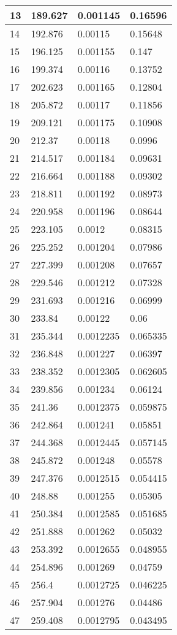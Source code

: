 \documentclass[twocolumn]{article}
\begin{document}
\begin{tabular}{l|l|l|l}
13	&	189.627	&	0.001145	&	0.16596  \\ \hline
14	&	192.876	&	0.00115	&	0.15648  \\ \hline
15	&	196.125	&	0.001155	&	0.147  \\ \hline
16	&	199.374	&	0.00116	&	0.13752  \\ \hline
17	&	202.623	&	0.001165	&	0.12804  \\ \hline
18	&	205.872	&	0.00117	&	0.11856  \\ \hline
19	&	209.121	&	0.001175	&	0.10908  \\ \hline
20	&	212.37	&	0.00118	&	0.0996  \\ \hline
21	&	214.517	&	0.001184	&	0.09631  \\ \hline
22	&	216.664	&	0.001188	&	0.09302  \\ \hline
23	&	218.811	&	0.001192	&	0.08973  \\ \hline
24	&	220.958	&	0.001196	&	0.08644  \\ \hline
25	&	223.105	&	0.0012	&	0.08315  \\ \hline
26	&	225.252	&	0.001204	&	0.07986  \\ \hline
27	&	227.399	&	0.001208	&	0.07657  \\ \hline
28	&	229.546	&	0.001212	&	0.07328  \\ \hline
29	&	231.693	&	0.001216	&	0.06999  \\ \hline
30	&	233.84	&	0.00122	&	0.06  \\ \hline
31	&	235.344	&	0.0012235	&	0.065335  \\ \hline
32	&	236.848	&	0.001227	&	0.06397  \\ \hline
33	&	238.352	&	0.0012305	&	0.062605  \\ \hline
34	&	239.856	&	0.001234	&	0.06124  \\ \hline
35	&	241.36	&	0.0012375	&	0.059875  \\ \hline
36	&	242.864	&	0.001241	&	0.05851  \\ \hline
37	&	244.368	&	0.0012445	&	0.057145  \\ \hline
38	&	245.872	&	0.001248	&	0.05578  \\ \hline
39	&	247.376	&	0.0012515	&	0.054415  \\ \hline
40	&	248.88	&	0.001255	&	0.05305  \\ \hline
41	&	250.384	&	0.0012585	&	0.051685  \\ \hline
42	&	251.888	&	0.001262	&	0.05032  \\ \hline
43	&	253.392	&	0.0012655	&	0.048955  \\ \hline
44	&	254.896	&	0.001269	&	0.04759  \\ \hline
45	&	256.4	&	0.0012725	&	0.046225  \\ \hline
46	&	257.904	&	0.001276	&	0.04486  \\ \hline
47	&	259.408	&	0.0012795	&	0.043495  \\ \hline
\end{tabular}
\end{document}
